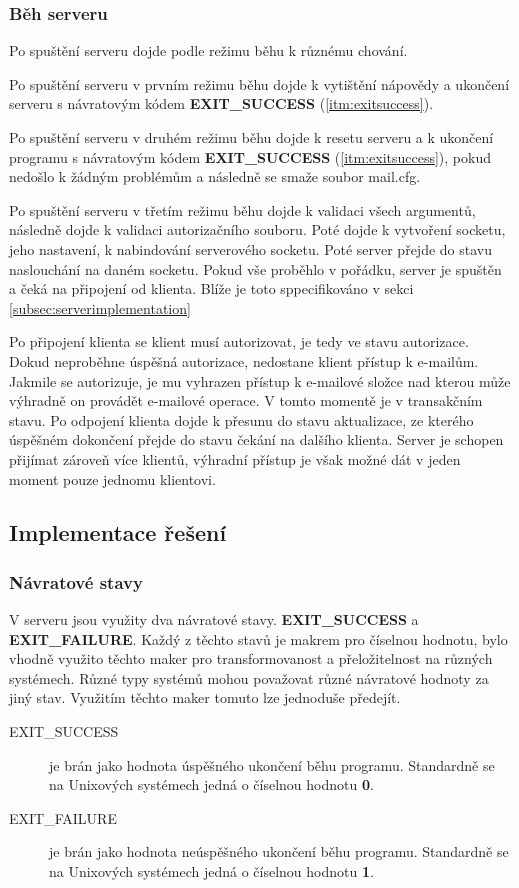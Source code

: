 \documentclass[11pt,a4paper]{report}
\begin{document}
    \subsubsection{Běh serveru}
    Po spuštění serveru dojde podle režimu běhu k různému chování.\\ \par
    Po spuštění serveru v prvním režimu běhu dojde k vytištění nápovědy a ukončení serveru s návratovým kódem \textbf{EXIT\_SUCCESS} (\ref{itm:exitsuccess}). \par
    Po spuštění serveru v druhém režimu běhu dojde k resetu serveru a k ukončení programu s návratovým kódem \textbf{EXIT\_SUCCESS} (\ref{itm:exitsuccess}), pokud nedošlo k žádným problémům a následně se smaže soubor mail.cfg.\par
    Po spuštění serveru v třetím režimu běhu dojde k validaci všech argumentů, následně dojde k validaci autorizačního souboru. Poté dojde k vytvoření socketu, jeho nastavení, k nabindování serverového socketu. Poté server přejde do stavu naslouchání na daném socketu. Pokud vše proběhlo v pořádku, server je spuštěn a čeká na připojení od klienta. Blíže je toto sppecifikováno v sekci \ref{subsec:serverimplementation}\par
    Po připojení klienta se klient musí autorizovat, je tedy ve stavu autorizace. Dokud neproběhne úspěšná autorizace, nedostane klient přístup k e-mailům. Jakmile se autorizuje, je mu vyhrazen přístup k e-mailové složce nad kterou může výhradně on provádět e-mailové operace. V tomto momentě je v transakčním stavu. Po odpojení klienta dojde k přesunu do stavu aktualizace, ze kterého úspěšném dokončení přejde do stavu čekání na dalšího klienta. Server je schopen přijímat zároveň více klientů, výhradní přístup je však možné dát v jeden moment pouze jednomu klientovi.

    \clearpage
    \subsection{Implementace řešení}
    \subsubsection{Návratové stavy}
    V serveru jsou využity dva návratové stavy. \textbf{EXIT\_SUCCESS} a \textbf{EXIT\_FAILURE}. Každý z těchto stavů je makrem pro číselnou hodnotu, bylo vhodně využito těchto maker pro transformovanost a přeložitelnost na různých systémech. Různé typy systémů mohou považovat různé návratové hodnoty za jiný stav. Využitím těchto maker tomuto lze jednoduše předejít.
    \begin{description}
        \item [EXIT\_SUCCESS] je brán jako hodnota úspěšného ukončení běhu programu. Standardně se na Unixových systémech jedná o číselnou hodnotu \textbf{0}.
        \label{itm:exitsuccess}
        \item [EXIT\_FAILURE] je brán jako hodnota neúspěšného ukončení běhu programu. Standardně se na Unixových systémech jedná o číselnou hodnotu \textbf{1}.
        \label{itm:exitfailure}
    \end{description}
\end{document}
